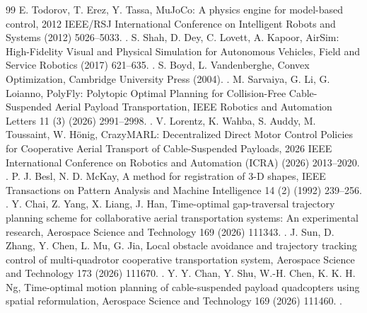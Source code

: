\begin{thebibliography}{99}
E. Todorov, T. Erez, Y. Tassa, MuJoCo: A physics engine for model-based control, 2012 IEEE/RSJ International Conference on Intelligent Robots and Systems (2012) 5026--5033. .
S. Shah, D. Dey, C. Lovett, A. Kapoor, AirSim: High-Fidelity Visual and Physical Simulation for Autonomous Vehicles, Field and Service Robotics (2017) 621--635. .
S. Boyd, L. Vandenberghe, Convex Optimization, Cambridge University Press (2004). .
M. Sarvaiya, G. Li, G. Loianno, PolyFly: Polytopic Optimal Planning for Collision-Free Cable-Suspended Aerial Payload Transportation, IEEE Robotics and Automation Letters 11 (3) (2026) 2991--2998. .
V. Lorentz, K. Wahba, S. Auddy, M. Toussaint, W. Hönig, CrazyMARL: Decentralized Direct Motor Control Policies for Cooperative Aerial Transport of Cable-Suspended Payloads, 2026 IEEE International Conference on Robotics and Automation (ICRA) (2026) 2013--2020. .
P. J. Besl, N. D. McKay, A method for registration of 3-D shapes, IEEE Transactions on Pattern Analysis and Machine Intelligence 14 (2) (1992) 239--256. .
Y. Chai, Z. Yang, X. Liang, J. Han, Time-optimal gap-traversal trajectory planning scheme for collaborative aerial transportation systems: An experimental research, Aerospace Science and Technology 169 (2026) 111343. .
J. Sun, D. Zhang, Y. Chen, L. Mu, G. Jia, Local obstacle avoidance and trajectory tracking control of multi-quadrotor cooperative transportation system, Aerospace Science and Technology 173 (2026) 111670. .
Y. Y. Chan, Y. Shu, W.-H. Chen, K. K. H. Ng, Time-optimal motion planning of cable-suspended payload quadcopters using spatial reformulation, Aerospace Science and Technology 169 (2026) 111460. .
\end{thebibliography}
